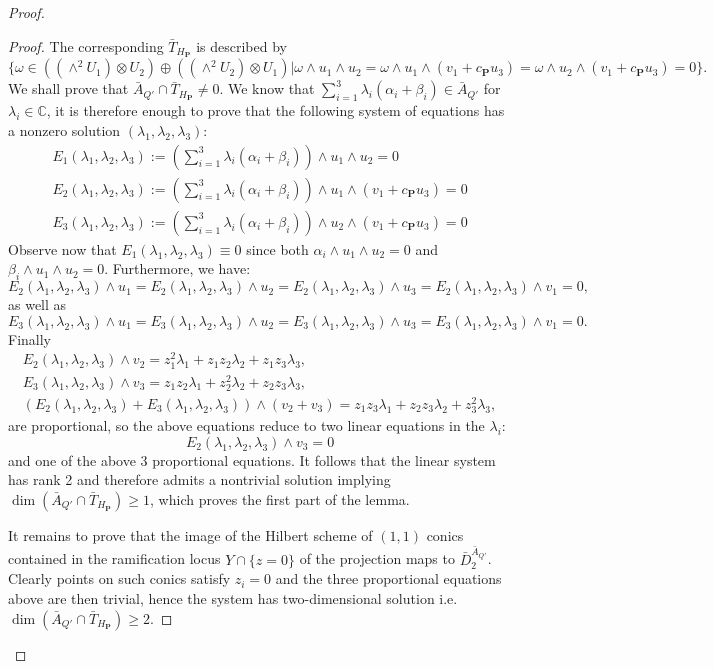\documentclass[a4paper,11pt]{amsart}
\theoremstyle{definition}
\numberwithin{equation}{section}
\numberwithin{equation}{section} \theoremstyle{definition}
\begin{document}
\begin{proof}
\begin{proof}
The corresponding $\bar{T}_{H_{\mathbf{P}}}$ is described by 
$$\{\omega\in ((\wedge^2 U_1)\otimes U_2) \oplus ((\wedge^2 U_2)\otimes U_1) | \omega\wedge u_1\wedge u_2= \omega\wedge u_1\wedge  (v_1+c_{\mathbf{P}} u_3)=\omega\wedge u_2\wedge  (v_1+c_{\mathbf{P}} u_3)=0\}.$$
We shall prove that $\bar{A}_{Q'}\cap \bar{T}_{H_{\mathbf{P}}}\neq 0$. We know that $\sum_{i=1}^3 \lambda_i (\alpha_i+\beta_i)\in \bar{A}_{Q'}$ for $\lambda_i\in {{\mathbb{C}  }}$,  it is therefore enough to prove that the following system of equations has a nonzero solution $(\lambda_1,\lambda_2,\lambda_3)$:
\begin{equation*}
\begin{split}
E_1(\lambda_1,\lambda_2,\lambda_3):=(\sum_{i=1}^3 \lambda_i (\alpha_i+\beta_i))\wedge u_1\wedge u_2=0\\
E_2(\lambda_1,\lambda_2,\lambda_3):=(\sum_{i=1}^3 \lambda_i (\alpha_i+\beta_i))\wedge u_1\wedge (v_1+c_{\mathbf{P}} u_3)=0\\
E_3(\lambda_1,\lambda_2,\lambda_3):=(\sum_{i=1}^3 \lambda_i (\alpha_i+\beta_i))\wedge u_2\wedge (v_1+c_{\mathbf{P}} u_3)=0
\end{split}
\end{equation*}
Observe now that $E_1(\lambda_1,\lambda_2,\lambda_3)\equiv 0$  since both $\alpha_i\wedge u_1\wedge u_2=0$ and $\beta_i\wedge u_1\wedge u_2=0$.
Furthermore, we have:
$$E_2(\lambda_1,\lambda_2,\lambda_3)\wedge u_1=E_2(\lambda_1,\lambda_2,\lambda_3)\wedge u_2=E_2(\lambda_1,\lambda_2,\lambda_3)\wedge u_3=E_2(\lambda_1,\lambda_2,\lambda_3)\wedge v_1=0,$$
as well as 
$$E_3(\lambda_1,\lambda_2,\lambda_3)\wedge u_1=E_3(\lambda_1,\lambda_2,\lambda_3)\wedge u_2=E_3(\lambda_1,\lambda_2,\lambda_3)\wedge u_3=E_3(\lambda_1,\lambda_2,\lambda_3)\wedge v_1=0.$$
Finally 
\begin{align}
E_2(\lambda_1,\lambda_2,\lambda_3)\wedge v_2= z_1^2 \lambda_1 +z_1z_2 \lambda_2+z_1z_3 \lambda_3,\\
E_3(\lambda_1,\lambda_2,\lambda_3)\wedge v_3= z_1z_2 \lambda_1 +z_2^2 \lambda_2+z_2z_3 \lambda_3,\\
(E_2(\lambda_1,\lambda_2,\lambda_3)+E_3(\lambda_1,\lambda_2,\lambda_3))\wedge (v_2+v_3)= z_1z_3 \lambda_1 +z_2 z_3 \lambda_2+z_3^2 \lambda_3,
\end{align}
are proportional, so the above equations reduce to two linear equations in the $\lambda_i$:
$$E_2(\lambda_1,\lambda_2,\lambda_3)\wedge v_3=0$$
and one of the above 3 proportional equations.
It follows that the linear system has rank 2 and therefore admits a nontrivial solution implying 
$\dim (\bar{A}_{Q'}\cap \bar{T}_{H_{\mathbf{P}}})\geq 1$, which proves the first part of the lemma.

It remains to prove that the image of the Hilbert scheme of $(1,1)$ conics contained in the ramification locus $Y\cap \{z=0\}$ of the projection maps to $\bar{D}^{\bar{A}_{Q'}}_2$. Clearly points on such conics satisfy $z_i=0$ and the three proportional equations above are then trivial, hence the system has two-dimensional solution i.e. $\dim (\bar{A}_{Q'}\cap \bar{T}_{H_{\mathbf{P}}})\geq 2$.
\end{proof}
\end{proof}
\end{document}
